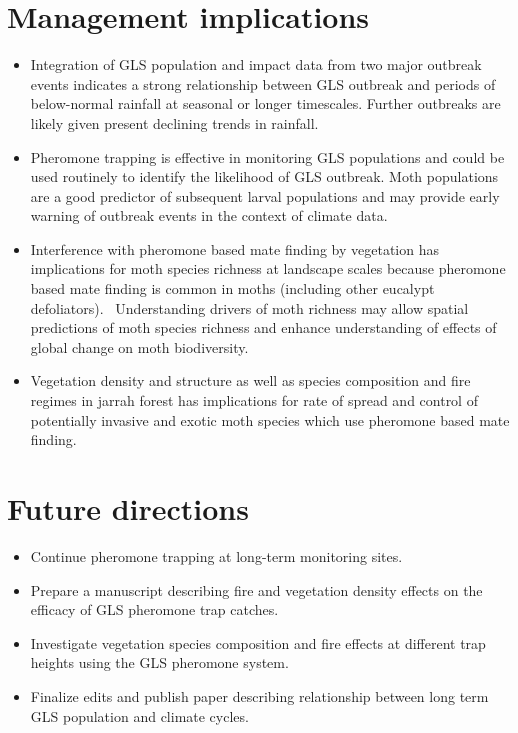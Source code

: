 \documentclass[version=last,
    paper=a4, %
    10pt, %
    usenames,
    dvipsnames,
    oneside, %
    headings=openany, %
    DIV=15 %
]{scrbook}
\begin{document}
\section*{Management implications}
\begin{itemize}
\itemsep1pt\parskip0pt
\item
  Integration of GLS population and impact data from two major outbreak
  events indicates a strong relationship between GLS outbreak and
  periods of below-normal rainfall at seasonal or longer timescales.
  Further outbreaks are likely given present declining trends in
  rainfall.
\item
  Pheromone trapping is effective in monitoring GLS populations and
  could be used routinely to identify the likelihood of GLS outbreak.
  Moth populations are a good predictor of subsequent larval populations
  and may provide early warning of outbreak events in the context of
  climate data.
\item
  Interference with pheromone based mate finding by vegetation has
  implications for moth species richness at landscape scales because
  pheromone based mate finding is common in moths (including other
  eucalypt defoliators).~ Understanding drivers of moth richness may
  allow spatial predictions of moth species richness and enhance
  understanding of effects of global change on moth biodiversity.
\item
  Vegetation density and structure as well as species composition and
  fire regimes in jarrah forest has implications for rate of spread and
  control of potentially invasive and exotic moth species which use
  pheromone based mate finding.
\end{itemize}



\section*{Future directions}
\begin{itemize}
\itemsep1pt\parskip0pt
\item
  Continue pheromone trapping at long-term monitoring sites.
\item
  Prepare a manuscript describing fire and vegetation density effects on
  the efficacy of GLS pheromone trap catches.
\item
  Investigate vegetation species composition and fire effects at
  different trap heights using the GLS pheromone system.
\item
  Finalize edits and publish paper describing relationship between long
  term GLS population and climate cycles.
\end{itemize}



\end{document}
